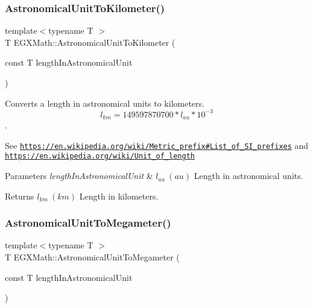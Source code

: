 \subsubsection{\texorpdfstring{Astronomical\+Unit\+To\+Kilometer()}{AstronomicalUnitToKilometer()}}
{\footnotesize\ttfamily template$<$typename T $>$ \\
T E\+G\+X\+Math\+::\+Astronomical\+Unit\+To\+Kilometer (\begin{DoxyParamCaption}\item[{const T}]{length\+In\+Astronomical\+Unit }\end{DoxyParamCaption})}



Converts a length in astronomical units to kilometers. \[ l_{km}=149597870700 * l_{au} * 10^{-3} \]. 

See \href{https://en.wikipedia.org/wiki/Metric_prefix#List_of_SI_prefixes}{\tt https\+://en.\+wikipedia.\+org/wiki/\+Metric\+\_\+prefix\#\+List\+\_\+of\+\_\+\+S\+I\+\_\+prefixes} and \href{https://en.wikipedia.org/wiki/Unit_of_length}{\tt https\+://en.\+wikipedia.\+org/wiki/\+Unit\+\_\+of\+\_\+length} 
\begin{DoxyParams}{Parameters}
{\em length\+In\+Astronomical\+Unit} & $ l_{au}\ (au)$ Length in astronomical units. \\
\hline
\end{DoxyParams}
\begin{DoxyReturn}{Returns}
$ l_{km}\ (km)$ Length in kilometers. 
\end{DoxyReturn}
\mbox{\label{group___e_g_x_math-_conversions-_length_conversions-_astronomical-_astronomical_unit-_s_i_ga0b4cbc4fcc40a26497debeba1f4049cd}} 
\subsubsection{\texorpdfstring{Astronomical\+Unit\+To\+Megameter()}{AstronomicalUnitToMegameter()}}
{\footnotesize\ttfamily template$<$typename T $>$ \\
T E\+G\+X\+Math\+::\+Astronomical\+Unit\+To\+Megameter (\begin{DoxyParamCaption}\item[{const T}]{length\+In\+Astronomical\+Unit }\end{DoxyParamCaption})}



